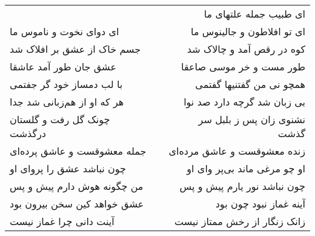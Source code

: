 \begin{center}
\begin{longtable}{l p{0.5cm} r}
&&
ای طبیب جمله علتهای ما
\\
ای دوای نخوت و ناموس ما
&&
ای تو افلاطون و جالینوس ما
\\
جسم خاک از عشق بر افلاک شد
&&
کوه در رقص آمد و چالاک شد
\\
عشق جان طور آمد عاشقا
&&
طور مست و خر موسی صاعقا
\\
با لب دمساز خود گر جفتمی
&&
همچو نی من گفتنیها گفتمی
\\
هر که او از هم‌زبانی شد جدا
&&
بی زبان شد گرچه دارد صد نوا
\\
چونک گل رفت و گلستان درگذشت
&&
نشنوی زان پس ز بلبل سر گذشت
\\
جمله معشوقست و عاشق پرده‌ای
&&
زنده معشوقست و عاشق مرده‌ای
\\
چون نباشد عشق را پروای او
&&
او چو مرغی ماند بی‌پر وای او
\\
من چگونه هوش دارم پیش و پس
&&
چون نباشد نور یارم پیش و پس
\\
عشق خواهد کین سخن بیرون بود
&&
آینه غماز نبود چون بود
\\
آینت دانی چرا غماز نیست
&&
زانک زنگار از رخش ممتاز نیست
\\
\end{longtable}
\end{center}
